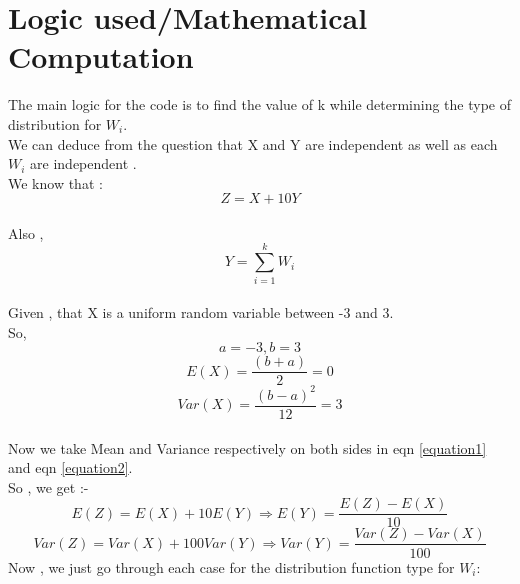 \documentclass{article}
\begin{document}
\section{Logic used/Mathematical Computation}
The main logic for the code is to find the value of k while determining the type of distribution for $W_i$.
\vspace{5pt}
\\We can deduce from the question that X and Y are independent as well as each $W_i$ are independent .
\vspace{10pt}
\vspace{10pt}
\\We know that :
\begin{equation} \label{equation1}
    Z = X + 10Y 
\end{equation}
\\Also ,
\begin{equation} \label{equation2}
    Y = \sum_{i = 1}^{k} W_i
\end{equation}
\\Given , that X is a uniform  random  variable between -3 and 3.
\\So,
$$ a = -3 , b = 3$$
$$ E(X) = \frac{(b+a)}{2} = 0$$
$$ Var(X) = \frac{(b-a)^2}{12} = 3$$
\\Now we take Mean and Variance respectively on both sides in eqn \ref{equation1} and eqn \ref{equation2}.
\vspace{5pt}
\\So , we get :- 
\begin{equation}
    E(Z) = E(X) + 10E(Y)
\Rightarrow E(Y) = \frac{E(Z) - E(X)}{10}
\end{equation}
\vspace{5pt}
\begin{equation}
    Var(Z) = Var(X) + 100Var(Y)
\Rightarrow Var(Y) = \frac{Var(Z) - Var(X)}{100}
\end{equation}
\newpage
Now , we just go through each case for the distribution function type for $W_i$:
\end{document}
